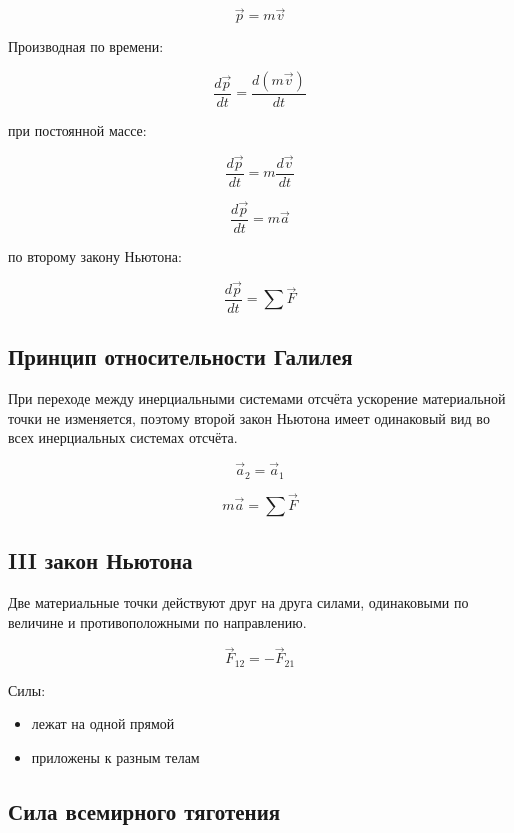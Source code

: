 \documentclass[a4paper,12pt]{article}
\begin{document}
\[
\vec p = m \vec v
\]

Производная по времени:

\[
\frac{d\vec p}{dt}
=
\frac{d(m\vec v)}{dt}
\]

при постоянной массе:

\[
\frac{d\vec p}{dt}
=
m \frac{d\vec v}{dt}
\]

\[
\frac{d\vec p}{dt}
=
m \vec a
\]

по второму закону Ньютона:

\[
\frac{d\vec p}{dt}
=
\sum \vec F
\]

\vspace{0.8em}

\subsection*{Принцип относительности Галилея}

\begin{theorembox}
При переходе между инерциальными системами отсчёта ускорение материальной точки не изменяется, поэтому второй закон Ньютона имеет одинаковый вид во всех инерциальных системах отсчёта.
\end{theorembox}

\[
\vec a_2 = \vec a_1
\]

\[
m \vec a = \sum \vec F
\]

\vspace{0.8em}

\subsection*{III закон Ньютона}

\begin{theorembox}
Две материальные точки действуют друг на друга силами, одинаковыми по величине и противоположными по направлению.
\end{theorembox}

\[
\vec F_{12} = - \vec F_{21}
\]

Силы:
\begin{itemize}
\item лежат на одной прямой
\item приложены к разным телам
\end{itemize}

\vspace{0.8em}

\subsection*{Сила всемирного тяготения}
\end{document}
